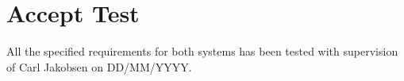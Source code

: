 \chapter{Accept Test}
All the specified requirements for both systems has been tested with supervision of Carl Jakobsen on DD/MM/YYYY. 


